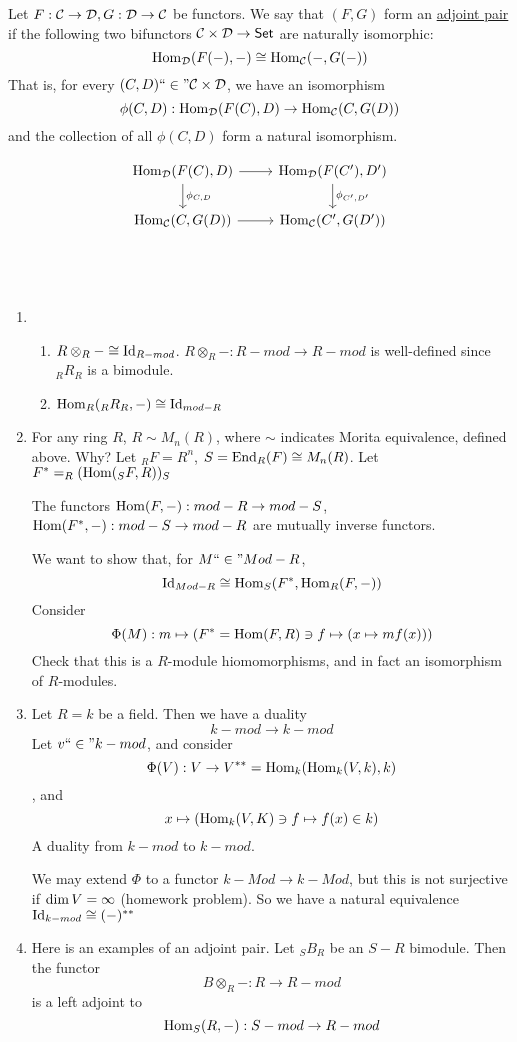 \documentclass[x11names,reqno,14pt]{extarticle}
\newcommand{\fin}{``\in"}
\begin{document}

Let $F:\mathcal{C}\to\mathcal{D}, G:\mathcal{D}\to\mathcal{C}$ be functors. We say that $(F, G)$ form an \underline{adjoint pair} if the following two bifunctors $\mathcal{C}\times\mathcal{D}\to{{\text{\sffamily {Set}}}}$ are naturally isomorphic:
\[
{\mathrm{Hom}}_{\mathcal{D}}(F(-),-) \cong {\mathrm{Hom}}_{\mathcal{C}}(-,G(-))
\]
That is, for every $(C, D) \fin \mc{C}\times\mc{D}$, we have an isomorphism
\[
\phi(C, D):{\mathrm{Hom}}_{\mathcal{D}}(F(C), D) \to {\mathrm{Hom}}_{\mathcal{C}}(C, G(D))
\]
and the collection of all $\phi(C, D)$ form a natural isomorphism.

\[
\begin{tikzcd}
\Hom_{\mc{D}}(F(C), D)\ar[r]\ar[d,"\phi_{C, D}"]& \Hom_{\mc{D}}(F(C'), D')\ar[d,"\phi_{C', D'}"] \\
\Hom_{\mc{C}}(C, G(D))\ar[r] &\Hom_{\mc{C}}(C', G(D')) \\
\end{tikzcd}
\]

\exm
\,

\begin{enumerate}

\item 
\begin{enumerate}[label=(\alph*)]
\item $R\otimes_R - \cong \operatorname{\mathrm{Id}}_{R-mod}$. $R\otimes_R-:R-mod\to R-mod$ is well-defined since $_RR_R$ is a bimodule. 
\item ${\mathrm{Hom}}_R(_RR_R, -) \cong \operatorname{\mathrm{Id}}_{mod-R}$
\end{enumerate}

\item For any ring $R$, $R\sim M_n(R)$, where $\sim$ indicates Morita equivalence, defined above. Why? Let $_RF = R^n$, $S = {\mathrm{End}}_R(F) \cong M_n(R)$. Let $F^* = _R({\mathrm{Hom}}(_SF, R))_S$

\claim 

The functors ${\mathrm{Hom}}(F, -):mod-R\to mod-S$, ${\mathrm{Hom}}(F^*, -):mod-S\to mod-R$ are mutually inverse functors. 

\proof

We want to show that, for $M \fin Mod-R$, 
\[
\operatorname{\mathrm{Id}}_{Mod-R}\cong {\mathrm{Hom}}_S(F^*, {\mathrm{Hom}}_R(F, -))
\]
Consider
\[
\Phi(M):m\mapsto (F^* = {\mathrm{Hom}}(F, R) \ni f \mapsto (x \mapsto mf(x)))
\]
Check that this is a $R$-module hiomomorphisms, and in fact an isomorphism of $R$-modules. 

\item Let $R = k$ be a field. Then we have a duality 
\[
k-mod\to k-mod
\]
Let $v \fin k-mod$, and consider 
\[
\Phi(V):V\to V^{**}= {\mathrm{Hom}}_k({\mathrm{Hom}}_k(V, k), k)
\]
, and
\[
x\mapsto({\mathrm{Hom}}_k(V, K) \ni f \mapsto f(x) \in k)
\]
A duality from $k-mod$ to $k-mod$. 

We may extend $\Phi$ to a functor $k-Mod\to k-Mod$, but this is not surjective if $\dim V = \infty$ (homework problem). So we have a natural equivalence $\operatorname{\mathrm{Id}}_{k-mod} \cong (-)^{**}$

\item Here is an examples of an adjoint pair. Let $_SB_R$ be an $S-R$ bimodule. Then the functor
\[
B\otimes_R-:R\to R-mod
\]
is a left adjoint to 
\[
{\mathrm{Hom}}_S(R, -):S-mod \to R-mod
\]
\end{enumerate}
\end{document}

